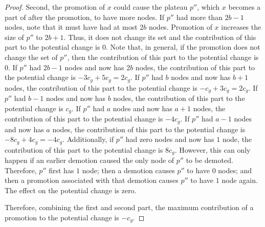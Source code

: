 \documentclass[11pt]{article}
\newcommand{\cons}[1]{\ensuremath{c_{#1}}}
\newcommand{\cnsg}{\cons g}
\newcommand{\hide}[1]{}
\begin{document}
\begin{proof}
Second, the promotion of $x$ could cause the plateau $p''$, which $x$ becomes a part of after the promotion, to have more nodes. 
If $p''$ had more than $2b-1$ nodes, note that it must have had at most $2b$ nodes. Promotion of $x$ increases the size of $p''$ to $2b+1$. Thus, it does not change its set and the contribution of this part to the potential change is $0$. 
Note that, in general, if the promotion does not change the set of $p''$, then the contribution of this part to the potential change is $0$. 
If $p''$ had\hide{between $b+1$ and} $2b-1$ nodes and now has $2b$  nodes, the contribution of this part to the potential change is $-3\cnsg + 5\cnsg = 2\cnsg$. 
If $p''$ had $b$ nodes and now has $b+1$ nodes, the contribution of this part to the potential change is $-\cnsg + 3\cnsg = 2\cnsg$. 
If $p''$ had\hide{ between $a+1$ and} $b-1$ nodes and now has $b$ nodes, the contribution of this part to the potential change is $\cnsg$. 
If $p''$ had $a$ nodes and now has $a+1$ nodes, the contribution of this part to the potential change is $-4\cnsg$. 
If $p''$ had\hide{ between $1$ and} $a-1$ nodes and now has $a$ nodes, the contribution of this part to the potential change is $-8\cnsg + 4\cnsg = -4\cnsg$. 
Additionally, if $p''$ had zero nodes and now has $1$ node, the contribution of this part to the potential change is $8\cnsg$. However, this can only happen if an earlier demotion caused the only node of $p''$ to be demoted. Therefore, $p''$ first has $1$ node; then a demotion causes $p''$ to have $0$ nodes; and then a promotion associated with that demotion causes $p''$ to have $1$ node again. The effect on the potential change is zero. 

Therefore, combining the first and second part, the maximum contribution of a promotion to the potential change is $-\cnsg$. 


\end{proof}
\end{document}
